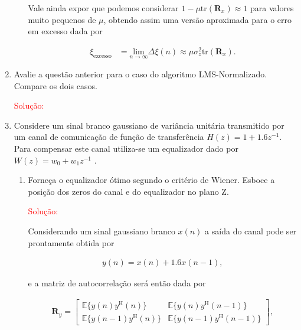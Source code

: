 \documentclass[a4paper,10pt]{article}
\begin{document}
\begin{enumerate}
\begin{enumerate}
						Vale ainda expor que podemos considerar $1 - \mu \text{tr}(\mathbf{R}_{x}) \approx 1$ para valores muito pequenos de $\mu$, obtendo assim uma versão aproximada para o erro em excesso dada por
						
						\begin{align}
							\xi_{\text{excesso}} &= \underset{n \rightarrow \infty}{\text{lim}} \Delta \xi(n) \approx \mu \sigma^{2}_{z} \text{tr}(\mathbf{R}_{x}).
						\end{align}

				\end{enumerate}

			\item Avalie a questão anterior para o caso do algoritmo LMS-Normalizado. Compare os dois casos.
				
			\textcolor{red}{Solução:}
						
			\item Considere um sinal branco gaussiano de variância unitária transmitido por um canal de comunicação de função de transferência $H(z) = 1 + 1.6z^{-1}$. Para compensar este
			canal utiliza-se um equalizador dado por $W(z) = w_{0} + w_{1}z^{-1}$ .
			
			
				\begin{enumerate}
					
					\item Forneça o equalizador ótimo segundo o critério de Wiener. Esboce a posição dos zeros do canal e do equalizador no plano Z.
					
						\textcolor{red}{Solução:}
						
						Considerando um sinal gaussiano branco $x(n)$ a saída do canal pode ser prontamente obtida por
						
						\begin{align}
							y(n) = x(n) + 1.6 x(n - 1),
						\end{align}
						
						e a matriz de autocorrelação será então dada por
						
						\begin{align}
							\mathbf{R}_{y} =
							\begin{bmatrix}
								\mathbb{E}\{y(n)y^{\text{H}}(n)\} & \mathbb{E}\{y(n)y^{\text{H}}(n - 1)\} \\
								\mathbb{E}\{y(n - 1)y^{\text{H}}(n)\} & \mathbb{E}\{y(n - 1)y^{\text{H}}(n - 1)\}
							\end{bmatrix},
						\end{align}
						

\end{enumerate}
\end{enumerate}
\end{document}

